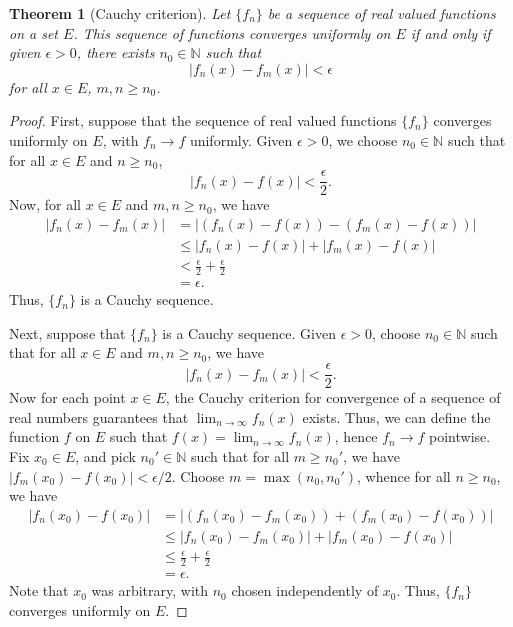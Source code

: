 \documentclass[11pt]{article}
\def\N{\mathbb{N}}
\newtheorem{theorem}{Theorem}[section]
\theoremstyle{definition}
\theoremstyle{remark}
\begin{document}
    \begin{theorem}[Cauchy criterion] \label{theo:cauchy_criterion}
        Let $\{f_n\}$ be a sequence of real valued functions on a set $E$.
        This sequence of functions converges uniformly on $E$ if and only if given
        $\epsilon > 0$, there exists $n_0 \in \N$ such that \[
            |f_n(x) - f_m(x)| < \epsilon
        \] for all $x \in E$, $m, n \geq n_0$.
    \end{theorem} 
    \begin{proof}
        First, suppose that the sequence of real valued functions $\{f_n\}$ converges
        uniformly on $E$, with $f_n \to f$ uniformly. Given $\epsilon > 0$, we choose
        $n_0 \in \N$ such that for all $x \in E$ and $n \geq n_0$, \[
            |f_n(x) - f(x)| < \frac{\epsilon}{2}.
        \] Now, for all $x \in E$ and $m, n \geq n_0$, we have
        \begin{align*}
            |f_n(x) - f_m(x)| &= |(f_n(x) - f(x)) - (f_m(x) - f(x))| \\
            &\leq |f_n(x) - f(x)| + |f_m(x) - f(x)| \\
            & < \frac{\epsilon}{2} + \frac{\epsilon}{2} \\
            &= \epsilon.
        \end{align*}
        Thus, $\{f_n\}$ is a Cauchy sequence.

        Next, suppose that $\{f_n\}$ is a Cauchy sequence. Given $\epsilon > 0$,
        choose $n_0 \in \N$ such that for all $x \in E$ and $m, n \geq n_0$, we have \[
            |f_n(x) - f_m(x)| < \frac{\epsilon}{2}.
        \] Now for each point $x \in E$, the Cauchy criterion for convergence of a
        sequence of real numbers guarantees that $\lim_{n \to \infty} f_n(x)$ exists.
        Thus, we can define the function $f$ on $E$ such that $f(x) = \lim_{n \to
        \infty} f_n(x)$, hence $f_n \to f$ pointwise. Fix $x_0 \in E$, and pick $n_0'
        \in \N$ such that for all $m \geq n_0'$, we have $|f_m(x_0) - f(x_0)| <
        \epsilon / 2$. Choose $m = \max(n_0, n_0')$, whence for all $n \geq n_0$, we
        have
        \begin{align*}
            |f_n(x_0) - f(x_0)| &= |(f_n(x_0) - f_m(x_0)) + (f_m(x_0) - f(x_0))| \\
            &\leq |f_n(x_0) - f_m(x_0)| + |f_m(x_0) - f(x_0)| \\
            &\leq \frac{\epsilon}{2} + \frac{\epsilon}{2} \\
            &= \epsilon.
        \end{align*}
        Note that $x_0$ was arbitrary, with $n_0$ chosen independently of $x_0$.
        Thus, $\{f_n\}$ converges uniformly on $E$.
    \end{proof}
    
\end{document}
